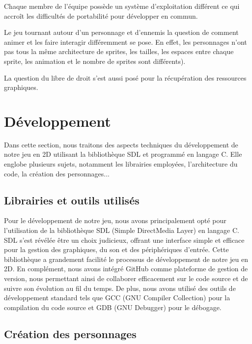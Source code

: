 \documentclass[a4paper,12pt]{article}
\begin{document}
Chaque membre de l’équipe possède un système d’exploitation différent ce qui accroît les difficultés de portabilité pour développer en commun.

Le jeu tournant autour d’un personnage et d’ennemis la question de comment animer et les faire interagir différemment se pose. En effet, les personnages n’ont pas tous la même architecture de sprites, les tailles,  les espaces entre chaque sprite, les animation et le nombre de sprites sont différents).

La question du libre de droit s’est aussi posé pour la récupération des ressources graphiques.


\section{Développement}

Dans cette section, nous traitons des aspects techniques du développement de notre jeu en 2D utilisant la bibliothèque SDL et programmé en langage C. Elle englobe plusieurs sujets, notamment les librairies employées, l'architecture du code, la création des personnages...

\subsection{Librairies et outils utilisés}

Pour le développement de notre jeu, nous avons principalement opté pour l'utilisation de la bibliothèque SDL (Simple DirectMedia Layer) en langage C. SDL s'est révélée être un choix judicieux, offrant une interface simple et efficace pour la gestion des graphiques, du son et des périphériques d'entrée. Cette bibliothèque a grandement facilité le processus de développement de notre jeu en 2D. En complément, nous avons intégré GitHub comme plateforme de gestion de version, nous permettant ainsi de collaborer efficacement sur le code source et de suivre son évolution au fil du temps. De plus, nous avons utilisé des outils de développement standard tels que GCC (GNU Compiler Collection) pour la compilation du code source et GDB (GNU Debugger) pour le débogage.

\subsection{Création des personnages}
\end{document}
